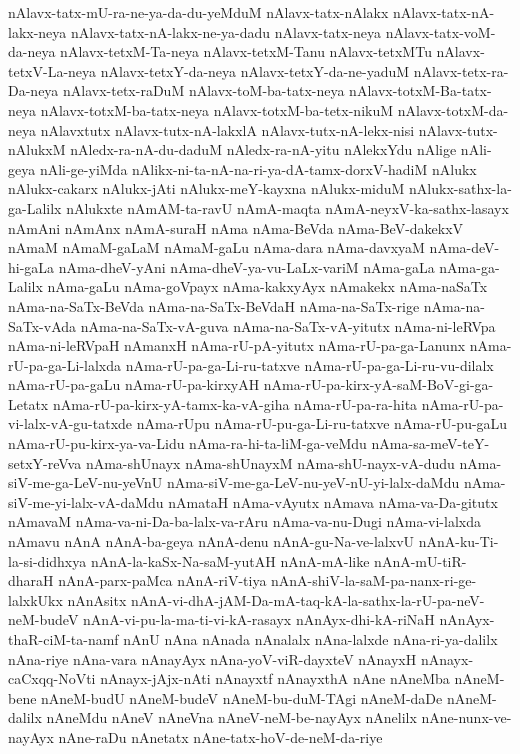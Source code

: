 {nAlavx-tatx-mU-ra-ne-ya-da-du-yeMduM
nAlavx-tatx-nAlakx
nAlavx-tatx-nA-lakx-neya
nAlavx-tatx-nA-lakx-ne-ya-dadu
nAlavx-tatx-neya
nAlavx-tatx-voM-da-neya
nAlavx-tetxM-Ta-neya
nAlavx-tetxM-Tanu
nAlavx-tetxMTu
nAlavx-tetxV-La-neya
nAlavx-tetxY-da-neya
nAlavx-tetxY-da-ne-yaduM
nAlavx-tetx-ra-Da-neya
nAlavx-tetx-raDuM
nAlavx-toM-ba-tatx-neya
nAlavx-totxM-Ba-tatx-neya
nAlavx-totxM-ba-tatx-neya
nAlavx-totxM-ba-tetx-nikuM
nAlavx-totxM-da-neya
nAlavxtutx
nAlavx-tutx-nA-lakxlA
nAlavx-tutx-nA-lekx-nisi
nAlavx-tutx-nAlukxM
nAledx-ra-nA-du-daduM
nAledx-ra-nA-yitu
nAlekxYdu
nAlige
nAli-geya
nAli-ge-yiMda
nAlikx-ni-ta-nA-na-ri-ya-dA-tamx-dorxV-hadiM
nAlukx
nAlukx-cakarx
nAlukx-jAti
nAlukx-meY-kayxna
nAlukx-miduM
nAlukx-sathx-la-ga-Lalilx
nAlukxte
nAmAM-ta-ravU
nAmA-maqta
nAmA-neyxV-ka-sathx-lasayx
nAmAni
nAmAnx
nAmA-suraH
nAma
nAma-BeVda
nAma-BeV-dakekxV
nAmaM
nAmaM-gaLaM
nAmaM-gaLu
nAma-dara
nAma-davxyaM
nAma-deV-hi-gaLa
nAma-dheV-yAni
nAma-dheV-ya-vu-LaLx-variM
nAma-gaLa
nAma-ga-Lalilx
nAma-gaLu
nAma-goVpayx
nAma-kakxyAyx
nAmakekx
nAma-naSaTx
nAma-na-SaTx-BeVda
nAma-na-SaTx-BeVdaH
nAma-na-SaTx-rige
nAma-na-SaTx-vAda
nAma-na-SaTx-vA-guva
nAma-na-SaTx-vA-yitutx
nAma-ni-leRVpa
nAma-ni-leRVpaH
nAmanxH
nAma-rU-pA-yitutx
nAma-rU-pa-ga-Lanunx
nAma-rU-pa-ga-Li-lalxda
nAma-rU-pa-ga-Li-ru-tatxve
nAma-rU-pa-ga-Li-ru-vu-dilalx
nAma-rU-pa-gaLu
nAma-rU-pa-kirxyAH
nAma-rU-pa-kirx-yA-saM-BoV-gi-ga-Letatx
nAma-rU-pa-kirx-yA-tamx-ka-vA-giha
nAma-rU-pa-ra-hita
nAma-rU-pa-vi-lalx-vA-gu-tatxde
nAma-rUpu
nAma-rU-pu-ga-Li-ru-tatxve
nAma-rU-pu-gaLu
nAma-rU-pu-kirx-ya-va-Lidu
nAma-ra-hi-ta-liM-ga-veMdu
nAma-sa-meV-teY-setxY-reVva
nAma-shUnayx
nAma-shUnayxM
nAma-shU-nayx-vA-dudu
nAma-siV-me-ga-LeV-nu-yeVnU
nAma-siV-me-ga-LeV-nu-yeV-nU-yi-lalx-daMdu
nAma-siV-me-yi-lalx-vA-daMdu
nAmataH
nAma-vAyutx
nAmava
nAma-va-Da-gitutx
nAmavaM
nAma-va-ni-Da-ba-lalx-va-rAru
nAma-va-nu-Dugi
nAma-vi-lalxda
nAmavu
nAnA
nAnA-ba-geya
nAnA-denu
nAnA-gu-Na-ve-lalxvU
nAnA-ku-Ti-la-si-didhxya
nAnA-la-kaSx-Na-saM-yutAH
nAnA-mA-like
nAnA-mU-tiR-dharaH
nAnA-parx-paMca
nAnA-riV-tiya
nAnA-shiV-la-saM-pa-nanx-ri-ge-lalxkUkx
nAnAsitx
nAnA-vi-dhA-jAM-Da-mA-taq-kA-la-sathx-la-rU-pa-neV-neM-budeV
nAnA-vi-pu-la-ma-ti-vi-kA-rasayx
nAnAyx-dhi-kA-riNaH
nAnAyx-thaR-ciM-ta-namf
nAnU
nAna
nAnada
nAnalalx
nAna-lalxde
nAna-ri-ya-dalilx
nAna-riye
nAna-vara
nAnayAyx
nAna-yoV-viR-dayxteV
nAnayxH
nAnayx-caCxqq-NoVti
nAnayx-jAjx-nAti
nAnayxtf
nAnayxthA
nAne
nAneMba
nAneM-bene
nAneM-budU
nAneM-budeV
nAneM-bu-duM-TAgi
nAneM-daDe
nAneM-dalilx
nAneMdu
nAneV
nAneVna
nAneV-neM-be-nayAyx
nAnelilx
nAne-nunx-ve-nayAyx
nAne-raDu
nAnetatx
nAne-tatx-hoV-de-neM-da-riye
}
